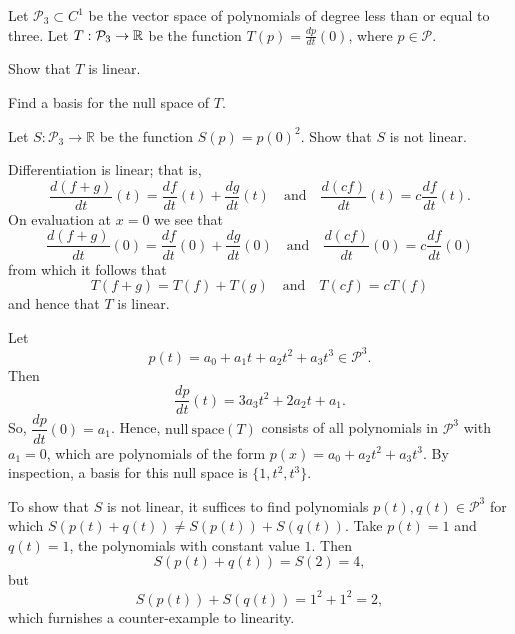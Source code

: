 \documentclass{ximera}
\author{Matthew Carr \& Marty Golubitsky}
\begin{document}
\begin{exercise}\label{mc.exerciseErr1}

Let $\mathcal{P}_3\subset C^1$ be the vector space of polynomials of degree less than or equal to three.  Let $T:\mathcal{P}_3\to \mbox{$\mathbb{R}$}$ be the function $T(p) = \frac{dp}{dt}(0)$, where $p\in\mathcal{P}$.
\begin{enumeratea}%
\item Show that $T$ is linear.
\item  Find a basis for the null space of $T$.
\item Let  $S:\mathcal{P}_3\rightarrow \mathbb{R}$ be the function $S(p)=p(0)^2$.  Show that $S$ is not linear.
\end{enumeratea}

  
\begin{solution}

\soln  
\begin{enumeratea}%
\item Differentiation is linear; that is, 
\[
\dfrac{d(f+g)}{dt}(t) = \dfrac{df}{dt}(t)+\dfrac{dg}{dt}(t) \quad \mbox{and} \quad 
\dfrac{d(cf)}{dt}(t) = c\dfrac{df}{dt}(t).
\]
On evaluation at $x=0$ we see that 
\[
\dfrac{d(f+g)}{dt}(0) = \dfrac{df}{dt}(0)+\dfrac{dg}{dt}(0) \quad \mbox{and} \quad 
\dfrac{d(cf)}{dt}(0) = c\dfrac{df}{dt}(0)
\]
from which it follows that
\[
T(f+g) = T(f) + T(g)  \quad \mbox{and} \quad  T(cf) = cT(f)
\]
and hence that $T$ is linear.
\item Let 
\[
p(t)=a_0+a_1t+a_2 t^2+a_3 t^3 \in \mathcal{P}^3.
\]
Then
 \[
 \dfrac{dp}{dt}(t)=3a_3t^2+2a_2 t+a_1.
 \]
So, $\dfrac{dp}{dt}(0)=a_1$. Hence, $\mathrm{null\ space}(T)$ consists of all polynomials in $\mathcal{P}^3$ with $a_1=0$, which are polynomials of the form $p(x)=a_0+a_2 t^2+a_3 t^3$. By inspection, a basis for this null space is $\{1,t^2,t^3\}$.
\item To show that $S$ is not linear, it suffices to find polynomials $p(t),q(t)\in\mathcal{P}^3$ for which $S(p(t)+q(t))\ne S(p(t))+S(q(t))$. Take $p(t)=1$ and $q(t)=1$, the polynomials with constant value $1$.  Then 
\[
S(p(t)+q(t)) = S(2) =4,
\]
but
\[
S(p(t))+S(q(t)) = 1^2+1^2 = 2,
\]
which furnishes a counter-example to linearity.
\end{enumeratea}
\end{solution}
\end{exercise}
\end{document}
